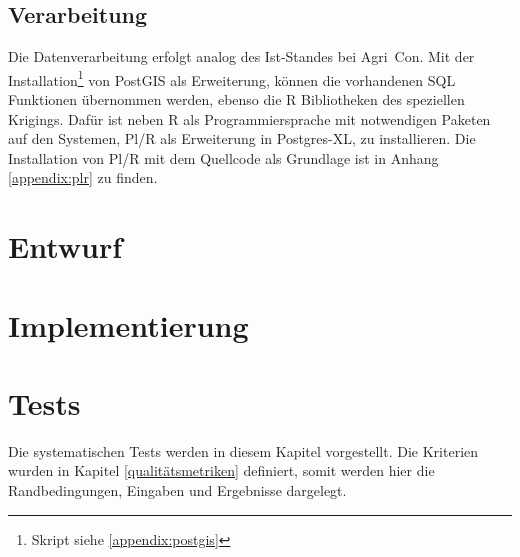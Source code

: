 \subsection{Verarbeitung}
Die Datenverarbeitung erfolgt analog des Ist-Standes bei Agri~Con.
Mit der Installation\footnote{Skript siehe \ref{appendix:postgis}} von PostGIS als Erweiterung, können die vorhandenen SQL Funktionen übernommen werden, ebenso die R Bibliotheken des speziellen Krigings.
Dafür ist neben R als Programmiersprache mit notwendigen Paketen auf den Systemen, Pl/R als Erweiterung in Postgres-XL, zu installieren.
Die Installation von Pl/R mit dem Quellcode als Grundlage ist in Anhang \ref{appendix:plr} zu finden.


\section{Entwurf}



\section{Implementierung}

\section{Tests}
Die systematischen Tests werden in diesem Kapitel vorgestellt.
Die Kriterien wurden in Kapitel \ref{qualitätsmetriken} definiert, somit werden hier die Randbedingungen, Eingaben und Ergebnisse dargelegt.

